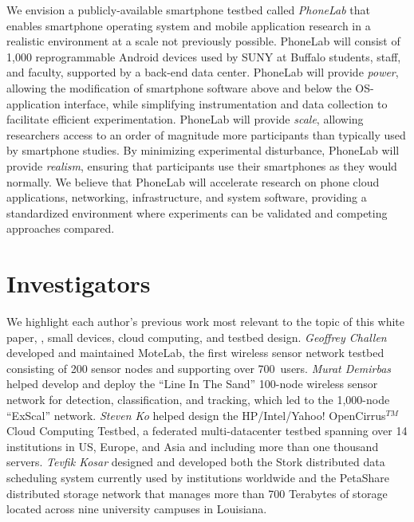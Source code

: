 We envision a publicly-available smartphone testbed called \emph{PhoneLab}
that enables smartphone operating system and mobile application research in a
realistic environment at a scale not previously possible. PhoneLab will
consist of 1,000 reprogrammable Android devices
used by SUNY at Buffalo students, staff, and faculty, supported by a back-end
data center. PhoneLab will provide \emph{power}, allowing the modification of
smartphone software above and below the OS-application interface, while
simplifying instrumentation and data collection to facilitate efficient
experimentation. PhoneLab will provide \emph{scale}, allowing researchers
access to an order of magnitude more participants than typically used by
smartphone studies. By minimizing experimental disturbance, PhoneLab will
provide \emph{realism}, ensuring that participants use their smartphones as
they would normally. We believe that PhoneLab will accelerate research on
phone cloud applications, networking, infrastructure, and system software,
providing a standardized environment where experiments can be validated and
competing approaches compared.


\section{Investigators}
We highlight each author's previous work most relevant to the topic of this
white paper, \ie, small devices, cloud computing, and testbed design.
\emph{Geoffrey Challen} developed and
maintained MoteLab, the first wireless
sensor network testbed consisting of 200 sensor nodes and supporting over
700~users. \emph{Murat Demirbas} helped develop and deploy the ``Line In
The Sand'' 100-node wireless sensor network for
detection, classification, and tracking, which led to the 1,000-node
``ExScal'' network. \emph{Steven Ko} helped design the
HP/Intel/Yahoo! OpenCirrus$^{TM}$ Cloud
Computing Testbed, a federated multi-datacenter testbed spanning over
14 institutions in US, Europe, and Asia and including more than one
thousand servers. \emph{Tevfik Kosar} designed and developed both the
Stork distributed data scheduling system currently used by institutions
worldwide and the PetaShare distributed storage network that manages more
than 700 Terabytes of storage located across nine university campuses in
Louisiana.

